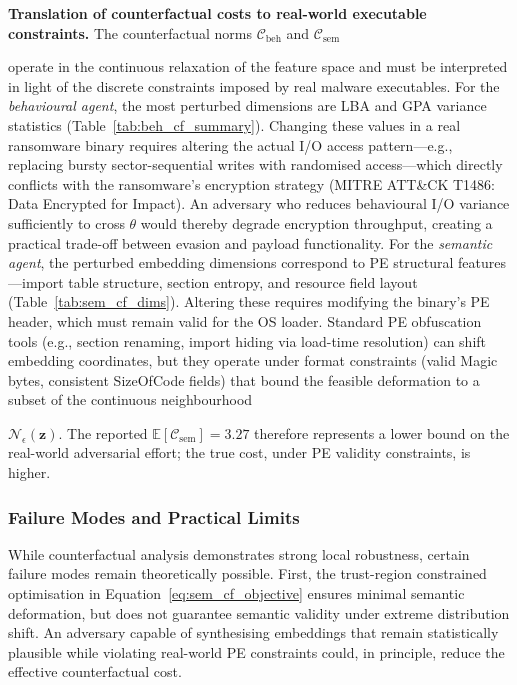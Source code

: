 \documentclass[3p]{elsarticle}
\begin{document}
\begin{changedblock}
\noindent\textbf{Translation of counterfactual costs to real-world executable constraints.}
The counterfactual norms $\mathcal{C}_{\mathrm{beh}}$ and $\mathcal{C}_{\mathrm{sem}}$
\end{changedblock}
operate in the continuous relaxation of the feature space and must be interpreted in light
of the discrete constraints imposed by real malware executables. For the \emph{behavioural
agent}, the most perturbed dimensions are LBA and GPA variance statistics
(Table~\ref{tab:beh_cf_summary}). Changing these values in a real ransomware binary requires
altering the actual I/O access pattern---e.g., replacing bursty sector-sequential writes
with randomised access---which directly conflicts with the ransomware's encryption
strategy (MITRE ATT\&CK T1486: Data Encrypted for Impact). An adversary who reduces
behavioural I/O variance sufficiently to cross $\theta$ would thereby degrade encryption
throughput, creating a practical trade-off between evasion and payload functionality.
For the \emph{semantic agent}, the perturbed embedding dimensions correspond to PE structural
features---import table structure, section entropy, and resource field layout
(Table~\ref{tab:sem_cf_dims}). Altering these requires modifying the binary's PE header,
which must remain valid for the OS loader. Standard PE obfuscation tools (e.g., section
renaming, import hiding via load-time resolution) can shift embedding coordinates, but
they operate under format constraints (valid Magic bytes, consistent SizeOfCode fields)
that bound the feasible deformation to a subset of the continuous neighbourhood
\begin{changedblock}
$\mathcal{N}_\epsilon(\mathbf{z})$. The reported $\mathbb{E}[\mathcal{C}_{\mathrm{sem}}] = 3.27$
therefore represents a lower bound on the real-world adversarial effort; the true cost,
under PE validity constraints, is higher.
\end{changedblock}

\subsubsection*{Failure Modes and Practical Limits}

While counterfactual analysis demonstrates strong local robustness, certain failure modes remain theoretically possible. First, the trust-region constrained optimisation in Equation~\eqref{eq:sem_cf_objective}
ensures minimal semantic deformation, but does not guarantee semantic validity under extreme distribution shift. An adversary capable of synthesising embeddings that remain statistically plausible while
violating real-world PE constraints could, in principle, reduce the effective counterfactual cost.
\end{document}
